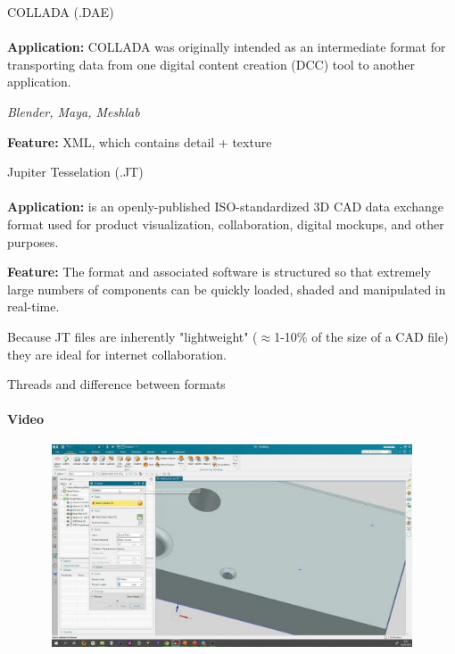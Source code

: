 \documentclass[aspectratio=169]{beamer}
\begin{document}
\begin{frame}[t]{COLLADA (.DAE)}
\framesubtitle{}
\textbf{Application:} COLLADA was originally intended as an intermediate format for transporting data from one digital content creation (DCC) tool to another application.

\textit{Blender, Maya, Meshlab}

\textbf{Feature:} XML, which contains detail + texture

\end{frame}

\begin{frame}[t]{Jupiter Tesselation (.JT)}
\framesubtitle{}
\textbf{Application:} is an openly-published ISO-standardized 3D CAD data exchange format used for product visualization, collaboration, digital mockups, and other purposes.

\textbf{Feature:} The format and associated software is structured so that extremely large numbers of components can be quickly loaded, shaded and manipulated in real-time. 

Because JT files are inherently "lightweight" ($\approx $1-10\% of the size of a CAD file) they are ideal for internet collaboration.

\end{frame}

\begin{frame}[t]{Threads and difference between formats}
    \framesubtitle{Video}
    \vspace{-0.6cm}
    \begin{figure}[H]
        \href{https://disk.yandex.ru/i/MwICQHVGWFesNw}{
            \centering\includegraphics[height=6cm,width=1\textwidth,keepaspectratio]{threads_preview.png}}
        \label{fig:threads_preview.png}
    \end{figure}
\end{frame}
\end{document}
